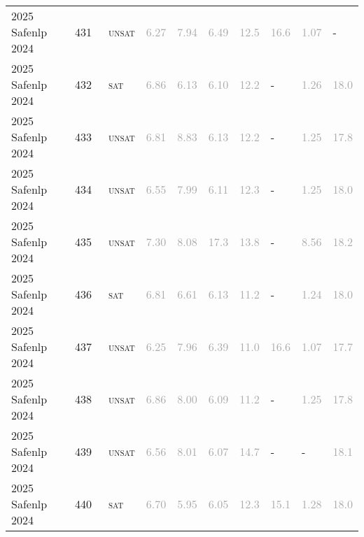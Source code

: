 \begin{center}
{\begin{longtable}{@{}llllllllll@{}}
2025 Safenlp 2024 & 431 & ~\textsc{unsat} & \textcolor{darkgray}{6.27} & \textcolor{darkgray}{7.94} & \textcolor{darkgray}{6.49} & \textcolor{darkgray}{12.5} & \textcolor{darkgray}{16.6} & \textcolor{darkgray}{1.07} & - \\
2025 Safenlp 2024 & 432 & ~\textsc{sat} & \textcolor{darkgray}{6.86} & \textcolor{darkgray}{6.13} & \textcolor{darkgray}{6.10} & \textcolor{darkgray}{12.2} & - & \textcolor{darkgray}{1.26} & \textcolor{darkgray}{18.0} \\
2025 Safenlp 2024 & 433 & ~\textsc{unsat} & \textcolor{darkgray}{6.81} & \textcolor{darkgray}{8.83} & \textcolor{darkgray}{6.13} & \textcolor{darkgray}{12.2} & - & \textcolor{darkgray}{1.25} & \textcolor{darkgray}{17.8} \\
2025 Safenlp 2024 & 434 & ~\textsc{unsat} & \textcolor{darkgray}{6.55} & \textcolor{darkgray}{7.99} & \textcolor{darkgray}{6.11} & \textcolor{darkgray}{12.3} & - & \textcolor{darkgray}{1.25} & \textcolor{darkgray}{18.0} \\
2025 Safenlp 2024 & 435 & ~\textsc{unsat} & \textcolor{darkgray}{7.30} & \textcolor{darkgray}{8.08} & \textcolor{darkgray}{17.3} & \textcolor{darkgray}{13.8} & - & \textcolor{darkgray}{8.56} & \textcolor{darkgray}{18.2} \\
2025 Safenlp 2024 & 436 & ~\textsc{sat} & \textcolor{darkgray}{6.81} & \textcolor{darkgray}{6.61} & \textcolor{darkgray}{6.13} & \textcolor{darkgray}{11.2} & - & \textcolor{darkgray}{1.24} & \textcolor{darkgray}{18.0} \\
2025 Safenlp 2024 & 437 & ~\textsc{unsat} & \textcolor{darkgray}{6.25} & \textcolor{darkgray}{7.96} & \textcolor{darkgray}{6.39} & \textcolor{darkgray}{11.0} & \textcolor{darkgray}{16.6} & \textcolor{darkgray}{1.07} & \textcolor{darkgray}{17.7} \\
2025 Safenlp 2024 & 438 & ~\textsc{unsat} & \textcolor{darkgray}{6.86} & \textcolor{darkgray}{8.00} & \textcolor{darkgray}{6.09} & \textcolor{darkgray}{11.2} & - & \textcolor{darkgray}{1.25} & \textcolor{darkgray}{17.8} \\
2025 Safenlp 2024 & 439 & ~\textsc{unsat} & \textcolor{darkgray}{6.56} & \textcolor{darkgray}{8.01} & \textcolor{darkgray}{6.07} & \textcolor{darkgray}{14.7} & - & - & \textcolor{darkgray}{18.1} \\
2025 Safenlp 2024 & 440 & ~\textsc{sat} & \textcolor{darkgray}{6.70} & \textcolor{darkgray}{5.95} & \textcolor{darkgray}{6.05} & \textcolor{darkgray}{12.3} & \textcolor{darkgray}{15.1} & \textcolor{darkgray}{1.28} & \textcolor{darkgray}{18.0} \\

\end{longtable}}
\end{center}
